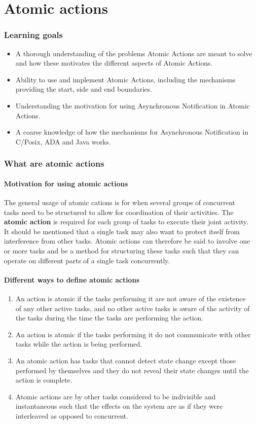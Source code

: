 \part{Atomic actions}
\section{Learning goals}
\begin{itemize}
\item  A thorough understanding of the problems Atomic Actions are meant to solve and how these motivates the different aspects of Atomic Actions.
\item Ability to use and implement Atomic Actions, including the mechanisms providing the start, side and end boundaries.
\item Understanding the motivation for using Asynchronous Notification in Atomic Actions.
\item A coarse knowledge of how the mechanisms for Asynchronous Notification in C/Posix, ADA and Java works.
\end{itemize}

\section{What are atomic actions}
\subsection{Motivation for using atomic actions}
The general usage of atomic cations is for when several groups of concurrent tasks need to be structured to allow for coordination of their activities. The \textbf{atomic action} is required for each group of tasks to execute their joint activity. It should be mentioned that a single task may also want to protect itself from interference from other tasks. Atomic actions can therefore be said to involve one or more tasks and be a method for structuring these tasks such that they can operate on different parts of a single task concurrently. 

\subsection{Different ways to define atomic actions }
\begin{enumerate}
\item An action is atomic if the tasks performing it are not aware of the existence of any other active tasks, and no other active tasks is aware of the activity of the tasks during the time the tasks are performing the action. 
\item An action is atomic if the tasks performing it do not communicate with other tasks while the action is being performed.
\item An atomic action has tasks that cannot detect state change except those performed by themselves and they do not reveal their state changes until the action is complete.
\item Atomic actions are by other tasks considered to be indivisible and instantaneous such that the effects on the system are as if they were interleaved as opposed to concurrent.  
\end{enumerate}

